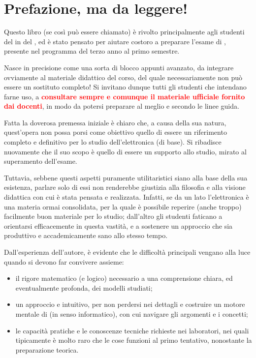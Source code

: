 \chapter{Prefazione, ma da leggere!}
\label{chap:prefazione}
Questo libro (se così può essere chiamato) è rivolto principalmente agli
studenti del \course{} in \emph{\prog} del \emph{\uni}, ed è stato pensato per
aiutare costoro a preparare l'esame di \emph{\DDcoursename}, presente nel
programma del terzo anno al primo semestre.

Nasce in precisione come una sorta di blocco appunti avanzato, da integrare
ovviamente al materiale didattico del corso, del quale necessariamente non può
essere un sostituto completo! Si invitano dunque tutti gli studenti che
intendano farne uso, a \textcolor{Red}{\textbf{consultare sempre e comunque il
materiale ufficiale fornito dai docenti}}, in modo da potersi preparare al
meglio e secondo le linee guida.

Fatta la doverosa premessa iniziale è chiaro che, a causa della sua natura,
quest'opera non possa porsi come obiettivo quello di essere un riferimento
completo e definitivo per lo studio dell'elettronica (di base). Si ribadisce
nuovamente che il suo scopo è quello di essere un supporto allo studio, mirato
al superamento dell'esame.

Tuttavia, sebbene questi aspetti puramente utilitaristici siano alla base della
sua esistenza, parlare solo di essi non renderebbe giustizia alla filosofia e
alla visione didattica con cui è stata pensata e realizzata. Infatti, se da un
lato l'elettronica è una materia ormai consolidata, per la quale è possibile
reperire (anche troppo) facilmente buon materiale per lo studio; dall'altro gli
studenti faticano a orientarsi efficacemente in questa vastità, e a sostenere un
approccio che sia produttivo e accademicamente sano allo stesso tempo.

Dall'esperienza dell'autore, è evidente che le difficoltà principali vengano
alla luce quando si devono far convivere assieme:
\begin{itemize}
\item il rigore matematico (e logico) necessario a una comprensione chiara, ed
eventualmente profonda, dei modelli studiati;
\item un approccio  e intuitivo, per non perdersi nei dettagli e
costruire un motore mentale di  (in senso informatico), con
cui navigare gli argomenti e i concetti;
\item le capacità pratiche e le conoscenze tecniche richieste nei laboratori,
nei quali tipicamente è molto raro che le cose funzioni al primo tentativo,
nonostante la preparazione teorica.
\end{itemize}

